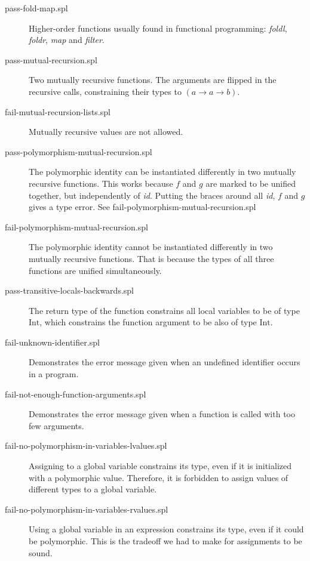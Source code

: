 \documentclass[a4paper]{article}
\newcommand{\arr}{\rightarrow}
\begin{document}
\begin{description}

  \item[pass-fold-map.spl] Higher-order functions usually found in functional
  programming: \emph{foldl}, \emph{foldr}, \emph{map} and \emph{filter}.

  \item[pass-mutual-recursion.spl] Two mutually recursive functions. The
  arguments are flipped in the recursive calls, constraining their types to $(a
  \arr a \arr b)$.

  \item[fail-mutual-recursion-lists.spl] Mutually recursive values are not
  allowed.

  \item[pass-polymorphism-mutual-recursion.spl] The polymorphic identity can be
  instantiated differently in two mutually recursive functions.  This works
  because $f$ and $g$ are marked to be unified together, but independently of
  \emph{id}.  Putting the braces around all \emph{id}, $f$ and $g$ gives a type
  error.  See fail-polymorphism-mutual-recursion.spl

  \item[fail-polymorphism-mutual-recursion.spl] The polymorphic identity cannot
  be instantiated differently in two mutually recursive functions.  That is
  because the types of all three functions are unified simultaneously.

  \item[pass-transitive-locals-backwards.spl] The return type of the function
  constrains all local variables to be of type $\text{Int}$, which constrains
  the function argument to be also of type $\text{Int}$.

  \item[fail-unknown-identifier.spl] Demonstrates the error message given when
  an undefined identifier occurs in a program.

  \item[fail-not-enough-function-arguments.spl] Demonstrates the error message
  given when a function is called with too few arguments.

  \item[fail-no-polymorphism-in-variables-lvalues.spl] Assigning to a global
  variable constrains its type, even if it is initialized with a polymorphic
  value.  Therefore, it is forbidden to assign values of different types to a
  global variable.

  \item[fail-no-polymorphism-in-variables-rvalues.spl] Using a global variable
  in an expression constrains its type, even if it could be polymorphic.  This
  is the tradeoff we had to make for assignments to be sound.


\end{description}
\end{document}
